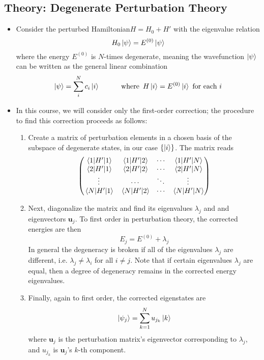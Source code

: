 \documentclass[11pt, a4paper]{article}
\newcommand{\Ham}{Hamiltonian\xspace}
\renewcommand{\vec}[1]{\bm{#1}} %
\newcommand{\p}{\psi}  %
\begin{document}
\subsection{Theory: Degenerate Perturbation Theory}
\begin{itemize}
	\item Consider the perturbed \Ham $ H = H_{0} + H' $ with the eigenvalue relation
	\begin{equation*}
		H_{0} \ket{\psi}  = E^{(0)} \ket{\psi}
	\end{equation*}
	where the energy $ E^{(0)} $ is $ N $-times degenerate, meaning the wavefunction $ \ket{\p} $ can be written as the general linear combination
	\begin{equation*}
		\ket{\psi} = \sum_{i}^{N}c_{i}\ket{i} \qquad \quad \text{where} \ \, H\ket{i} = E^{(0)} \ket{i} \ \text{for each } i
	\end{equation*}
	\item In this course, we will consider only the first-order correction; the procedure to find this correction proceeds as follows:
	\begin{enumerate}
		\item Create a matrix of perturbation elements in a chosen basis of the subspace of degenerate states, in our case $ \{\ket{i}\} $. The matrix reads
		\begin{equation*}
			\begin{pmatrix}
				\mel{1}{H'}{1} & \mel{1}{H'}{2} &  \cdots & \mel{1}{H'}{N} \\
				\mel{2}{H'}{1} & \mel{2}{H'}{2} &  \cdots & \mel{2}{H'}{N} \\
				\vdots & \cdots & \ddots & \vdots\\
				\mel{N}{H'}{1} & \mel{N}{H'}{2} &  \cdots & \mel{N}{H'}{N} 
			\end{pmatrix}
		\end{equation*}
		
		\item Next, diagonalize the matrix and find its eigenvalues $ \lambda_{j} $ and and eigenvectors $ \vec{u}_{j} $. To first order in perturbation theory, the corrected energies are then
		\begin{equation*}
			E_{j} = E^{(0)} + \lambda_{j} 
		\end{equation*}
		In general the degeneracy is broken if all of the eigenvalues $ \lambda_{j} $ are different, i.e. $ \lambda_{j} \neq \lambda_{i} $ for all $ i \neq j $. Note that if certain eigenvalues $ \lambda_{j} $ are equal, then a degree of degeneracy remains in the corrected energy eigenvalues.
		
		\item Finally, again to first order, the corrected eigenstates are 
		\begin{equation*}
			\ket{\p_{j}} = \sum_{k=1}^{N}u_{j_{k}} \ket{k}
		\end{equation*}
		where $ \vec{u}_{j} $ is the perturbation matrix's eigenvector corresponding to $ \lambda_{j} $, and $ u_{j_{k}} $ is $ \vec{u}_{j} $'s $ k $-th component.
	\end{enumerate}
\end{itemize}
\end{document}
